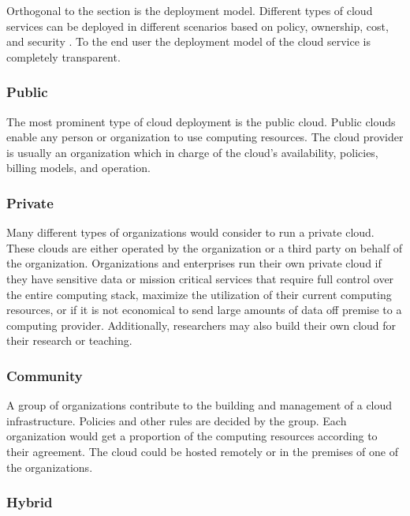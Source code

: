 \documentclass[12pt]{article}
\begin{document}
Orthogonal to the  section is the deployment model. Different types of cloud services can be deployed in different scenarios based on policy, ownership, cost, and security \cite{dillon2010cloud}. To the end user the deployment model of the cloud service is completely transparent.

\subsubsection{Public} \label{ssub:deploy-public}

The most prominent type of cloud deployment is the public cloud. Public clouds enable any person or organization to use computing resources. The cloud provider is usually an organization which in charge of the cloud's availability, policies, billing models, and operation.


\subsubsection{Private} \label{ssub:deploy-private}

Many different types of organizations would consider to run a private cloud. These clouds are either operated by the organization or a third party on behalf of the organization. Organizations and enterprises run their own private cloud if they have sensitive data or mission critical services that require full control over the entire computing stack, maximize the utilization of their current computing resources, or if it is not economical to send large amounts of data off premise to a computing provider. Additionally, researchers may also build their own cloud for their research or teaching.


\subsubsection{Community} \label{ssub:deploy-community}

A group of organizations contribute to the building and management of a cloud infrastructure. Policies and other rules are decided by the group. Each organization would get a proportion of the computing resources according to their agreement. The cloud could be hosted remotely or in the premises of one of the organizations.



\subsubsection{Hybrid} \label{ssub:deploy-hybrid}
\end{document}
